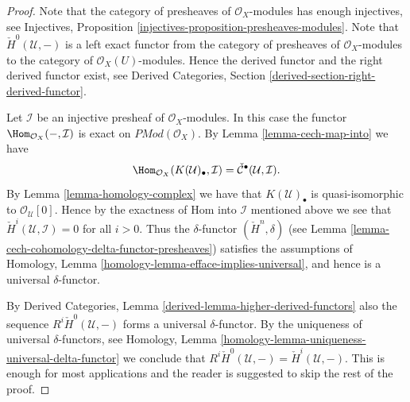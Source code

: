 \begin{proof}
Note that the category of presheaves of $\mathcal{O}_X$-modules
has enough injectives, see
Injectives, Proposition \ref{injectives-proposition-presheaves-modules}.
Note that $\check{H}^0(\mathcal{U}, -)$ is a left exact functor
from the category of presheaves of $\mathcal{O}_X$-modules
to the category of $\mathcal{O}_X(U)$-modules.
Hence the derived functor and the right derived functor exist, see
Derived Categories, Section \ref{derived-section-right-derived-functor}.

\medskip\noindent
Let $\mathcal{I}$ be an injective presheaf of $\mathcal{O}_X$-modules.
In this case the functor $\Hom_{\mathcal{O}_X}(-, \mathcal{I})$
is exact on $\textit{PMod}(\mathcal{O}_X)$. By
Lemma \ref{lemma-cech-map-into} we have
$$
\Hom_{\mathcal{O}_X}(K(\mathcal{U})_\bullet, \mathcal{I})
=
\check{\mathcal{C}}^\bullet(\mathcal{U}, \mathcal{I}).
$$
By Lemma \ref{lemma-homology-complex} we have that $K(\mathcal{U})_\bullet$ is
quasi-isomorphic to $\mathcal{O}_\mathcal{U}[0]$. Hence by
the exactness of Hom into $\mathcal{I}$ mentioned above we see
that $\check{H}^i(\mathcal{U}, \mathcal{I}) = 0$ for all
$i > 0$. Thus the $\delta$-functor $(\check{H}^n, \delta)$
(see Lemma \ref{lemma-cech-cohomology-delta-functor-presheaves})
satisfies the assumptions of
Homology, Lemma \ref{homology-lemma-efface-implies-universal},
and hence is a universal $\delta$-functor.

\medskip\noindent
By
Derived Categories, Lemma \ref{derived-lemma-higher-derived-functors}
also the sequence $R^i\check{H}^0(\mathcal{U}, -)$
forms a universal $\delta$-functor. By the uniqueness of universal
$\delta$-functors, see
Homology, Lemma \ref{homology-lemma-uniqueness-universal-delta-functor}
we conclude that
$R^i\check{H}^0(\mathcal{U}, -) = \check{H}^i(\mathcal{U}, -)$.
This is enough for most applications
and the reader is suggested to skip the rest of the proof.


\end{proof}
